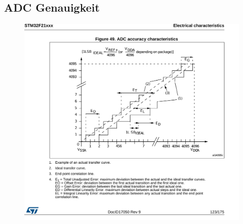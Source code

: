 \begin{appendices}
	\newpage
	\section{ADC Genauigkeit}\label{sec:stm32f21xx-adc}
	\begin{figure}[h!]
		\centering
		\includegraphics[width=1\textwidth]{../fig/stm32f21xx-adc.pdf}
	\end{figure}

	\newpage

\end{appendices}
